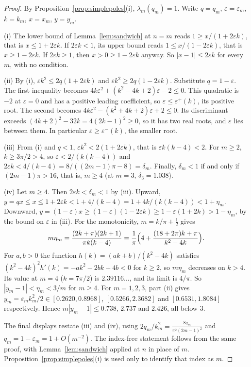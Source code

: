 \documentclass[11pt]{article}
\theoremstyle{plain}
\theoremstyle{definition}
\theoremstyle{remark}
\begin{document}
\begin{proof}
By Proposition~\ref{prop:simplepoles}\textup{(i)}, $\lambda_m(q_m)=1$. Write $q=q_m$,
$\varepsilon=\varepsilon_m$, $k=k_m$, $x=x_m$, $y=y_m$.

(i) The lower bound of Lemma~\ref{lem:sandwich} at $n=m$ reads $1\ge x/(1+2\varepsilon k)$, that is
$x\le1+2\varepsilon k$. If $2\varepsilon k<1$, its upper bound reads $1\le x/(1-2\varepsilon k)$, that
is $x\ge1-2\varepsilon k$. If $2\varepsilon k\ge1$, then $x>0\ge1-2\varepsilon k$ anyway. So
$|x-1|\le2\varepsilon k$ for every $m$, with no condition.

(ii) By (i), $\varepsilon k^2\le2q(1+2\varepsilon k)$ and $\varepsilon k^2\ge2q(1-2\varepsilon k)$.
Substitute $q=1-\varepsilon$. The first inequality becomes
$4k\varepsilon^2+(k^2-4k+2)\varepsilon-2\le0$. This quadratic is $-2$ at $\varepsilon=0$ and has a
positive leading coefficient, so $\varepsilon\le\varepsilon^+(k)$, its positive root. The second
becomes $4k\varepsilon^2-(k^2+4k+2)\varepsilon+2\le0$. Its discriminant exceeds
$(4k+2)^2-32k=4(2k-1)^2\ge0$, so it has two real roots, and $\varepsilon$ lies between them. In
particular $\varepsilon\ge\varepsilon^-(k)$, the smaller root.

(iii) From (i) and $q<1$, $\varepsilon k^2<2(1+2\varepsilon k)$, that is
$\varepsilon k(k-4)<2$. For $m\ge2$, $k\ge3\pi/2>4$, so $\varepsilon<2/(k(k-4))$ and
$2\varepsilon k<4/(k-4)=8/((2m-1)\pi-8)=\delta_m$. Finally, $\delta_m<1$ if and only if
$(2m-1)\pi>16$, that is, $m\ge4$ (at $m=3$, $\delta_3=1.038$).

(iv) Let $m\ge4$. Then $2\varepsilon k<\delta_m<1$ by (iii). Upward,
$y=qx\le x\le1+2\varepsilon k<1+4/(k-4)=1+4k/(k(k-4))<1+\eta_m$. Downward,
$y=(1-\varepsilon)x\ge(1-\varepsilon)(1-2\varepsilon k)\ge1-\varepsilon(1+2k)>1-\eta_m$, by the
bound on $\varepsilon$ in (iii). For the monotonicity, $m=k/\pi+\tfrac12$ gives
\[
   m\eta_m=\frac{(2k+\pi)(2k+1)}{\pi k(k-4)}=\frac1\pi\Bigl(4+\frac{(18+2\pi)k+\pi}{k^2-4k}\Bigr).
\]
For $a,b>0$ the function $h(k)=(ak+b)/(k^2-4k)$ satisfies
$(k^2-4k)^2h'(k)=-ak^2-2bk+4b<0$ for $k\ge2$, so $m\eta_m$ decreases on $k>4$. Its value at $m=4$
($k=7\pi/2$) is $2.39116\ldots$, and its limit is $4/\pi$. So $|y_m-1|<\eta_m<3/m$ for $m\ge4$.
For $m=1,2,3$, part (ii) gives $y_m=\varepsilon_mk_m^2/2\in[0.2620,0.8968]$, $[0.5266,2.3682]$ and
$[0.6531,1.8084]$ respectively. Hence $m|y_m-1|\le0.738$, $2.737$ and $2.426$, all below $3$.

The final displays restate (iii) and (iv), using $2q_m/k_m^2=\frac{8q_m}{\pi^2(2m-1)^2}$ and
$q_m=1-\varepsilon_m=1+O(m^{-2})$. The index-free statement follows from the same proof, with
Lemma~\ref{lem:sandwich} applied at $n$ in place of $m$. Proposition~\ref{prop:simplepoles}\textup{(i)}
is used only to identify that index as $m$.
\end{proof}
\end{document}
